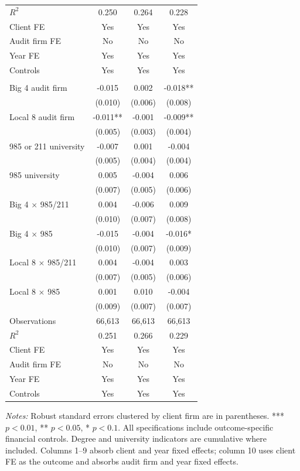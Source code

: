 \documentclass[10pt]{article}
\begin{document}
\begin{minipage}{19cm}
\begin{threeparttable}
\begin{tabular}{p{}ccc}
$R^{2}$ & 0.250 & 0.264 & 0.228 \\
Client FE & Yes & Yes & Yes \\
Audit firm FE & No & No & No \\
Year FE & Yes & Yes & Yes \\
Controls & Yes & Yes & Yes \\
\addlinespace
\multicolumn{4}{l}{\textbf{Panel B: Cumulative university tiers (base: neither 985 nor 211)}} \\
Big 4 audit firm & -0.015 & 0.002 & -0.018** \\
 & (0.010) & (0.006) & (0.008) \\
Local 8 audit firm & -0.011** & -0.001 & -0.009** \\
 & (0.005) & (0.003) & (0.004) \\
985 or 211 university & -0.007 & 0.001 & -0.004 \\
 & (0.005) & (0.004) & (0.004) \\
985 university & 0.005 & -0.004 & 0.006 \\
 & (0.007) & (0.005) & (0.006) \\
Big 4 $\times$ 985/211 & 0.004 & -0.006 & 0.009 \\
 & (0.010) & (0.007) & (0.008) \\
Big 4 $\times$ 985 & -0.015 & -0.004 & -0.016* \\
 & (0.010) & (0.007) & (0.009) \\
Local 8 $\times$ 985/211 & 0.004 & -0.004 & 0.003 \\
 & (0.007) & (0.005) & (0.006) \\
Local 8 $\times$ 985 & 0.001 & 0.010 & -0.004 \\
 & (0.009) & (0.007) & (0.007) \\
Observations & 66,613 & 66,613 & 66,613 \\
$R^{2}$ & 0.251 & 0.266 & 0.229 \\
Client FE & Yes & Yes & Yes \\
Audit firm FE & No & No & No \\
Year FE & Yes & Yes & Yes \\
Controls & Yes & Yes & Yes \\
\bottomrule
\end{tabular}
\begin{tablenotes}\fontsize{9}{11}\selectfont
\item \raggedright \fontsize{9}{11}\selectfont \textit{Notes:} Robust standard errors clustered by client firm are in parentheses. *** $p<0.01$, ** $p<0.05$, * $p<0.1$. All specifications include outcome-specific financial controls. Degree and university indicators are cumulative where included.
Columns 1--9 absorb client and year fixed effects; column 10 uses client FE as the outcome and absorbs audit firm and year fixed effects.
\end{tablenotes}
\end{threeparttable}

\end{minipage}
\end{document}
